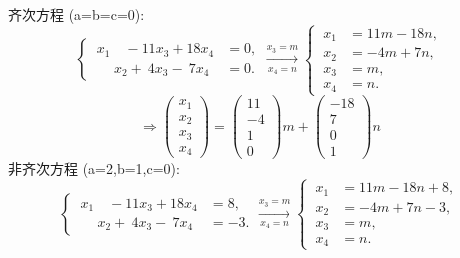 \documentclass{article}
\begin{document}
\begin{enumerate}
        齐次方程 (a=b=c=0):
        \[
            \begin{cases}
                \ x_1\quad -11x_3+18x_4&=0,\\
                \ \quad \ x_2+\ 4x_3-\ 7x_4&=0.
            \end{cases}
            \xrightarrow[x_4=n]{x_3=m}
            \begin{cases}
                \ x_1&=11m-18n,\\
                \ x_2&=-4m+7n,\\
                \ x_3&=m,\\
                \ x_4&=n.
            \end{cases}
            \]
            \[
            \Rightarrow
            \left(
                \begin{array}{ccc}
                    x_1\\
                    x_2\\
                    x_3\\
                    x_4
                \end{array}
            \right)
            =
            \left(\begin{array}{ccc}
                    11\\
                    -4\\
                    1\\
                    0
                \end{array}\right)
            m+
            \left(\begin{array}{ccc}
                    -18\\
                    7\\
                    0\\
                    1
                \end{array}\right)
            n
        \]
        非齐次方程 (a=2,b=1,c=0):
        \[
            \begin{cases}
                \ x_1\quad -11x_3+18x_4&=8,\\
                \ \quad \ x_2+\ 4x_3-\ 7x_4&=-3.
            \end{cases}
            \xrightarrow[x_4=n]{x_3=m}
            \begin{cases}
                \ x_1&=11m-18n+8,\\
                \ x_2&=-4m+7n-3,\\
                \ x_3&=m,\\
                \ x_4&=n.

\end{cases}\]
\end{enumerate}
\end{document}

